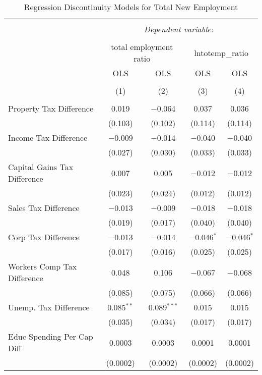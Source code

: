 
\begin{table}[!htbp] \centering 
  \caption{Regression Discontinuity Models for  Total New Employment} 
  \label{--rd} 
\begin{tabular}{@{\extracolsep{5pt}}lcccc} 
\\[-1.8ex]\hline 
\hline \\[-1.8ex] 
 & \multicolumn{4}{c}{\textit{Dependent variable:}} \\ 
\cline{2-5} 
\\[-1.8ex] & \multicolumn{2}{c}{total employment ratio} & \multicolumn{2}{c}{lntotemp\_ratio} \\ 
 & OLS & OLS & OLS & OLS \\ 
\\[-1.8ex] & (1) & (2) & (3) & (4)\\ 
\hline \\[-1.8ex] 
 Property Tax Difference & 0.019 & $-$0.064 & 0.037 & 0.036 \\ 
  & (0.103) & (0.102) & (0.114) & (0.114) \\ 
  Income Tax Difference & $-$0.009 & $-$0.014 & $-$0.040 & $-$0.040 \\ 
  & (0.027) & (0.030) & (0.033) & (0.033) \\ 
  Capital Gains Tax Difference & 0.007 & 0.005 & $-$0.012 & $-$0.012 \\ 
  & (0.023) & (0.024) & (0.012) & (0.012) \\ 
  Sales Tax Difference & $-$0.013 & $-$0.009 & $-$0.018 & $-$0.018 \\ 
  & (0.019) & (0.017) & (0.040) & (0.040) \\ 
  Corp Tax Difference & $-$0.013 & $-$0.014 & $-$0.046$^{*}$ & $-$0.046$^{*}$ \\ 
  & (0.017) & (0.016) & (0.025) & (0.025) \\ 
  Workers Comp Tax Difference & 0.048 & 0.106 & $-$0.067 & $-$0.068 \\ 
  & (0.085) & (0.075) & (0.066) & (0.066) \\ 
  Unemp. Tax Difference & 0.085$^{**}$ & 0.089$^{***}$ & 0.015 & 0.015 \\ 
  & (0.035) & (0.034) & (0.017) & (0.017) \\ 
  Educ Spending Per Cap Diff & 0.0003 & 0.0003 & 0.0001 & 0.0001 \\ 
  & (0.0002) & (0.0002) & (0.0002) & (0.0002) \\ 

\end{tabular}
\end{table}
